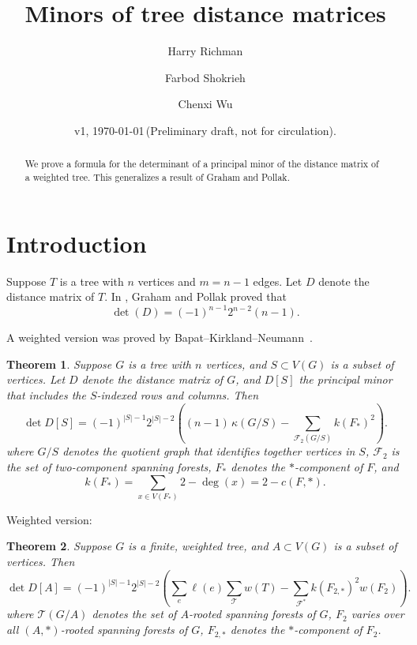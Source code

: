 \documentclass{amsart}
\newtheorem{thm}{Theorem}
\theoremstyle{definition}
\begin{document}
\title[Tree distance minors]{Minors of tree distance matrices}
\author{Harry Richman}
\author{Farbod Shokrieh}
\author{Chenxi Wu}
\date{v1, \today  \,(Preliminary draft, not for circulation).}


\begin{abstract}
We prove a formula for the determinant of 
a principal minor of
the distance matrix of a weighted tree.
This generalizes a result of Graham and Pollak.
\end{abstract}
\maketitle

\setcounter{tocdepth}{1}
\tableofcontents

\section{Introduction}

Suppose $T$ is a tree with $n$ vertices and $m=n-1$ edges.
Let $D$ denote the distance matrix of $T$.
In
\cite{graham-pollak},
Graham and Pollak proved that
\begin{equation}
\det(D) = (-1)^{n-1} 2^{n-2} (n-1). 
\end{equation}

A weighted version was proved by Bapat--Kirkland--Neumann~\cite{bapat-kirkland-neumann}.
\begin{thm}
\label{thm:main}
Suppose $G$ is a tree with $n$ vertices, and $S \subset V(G)$ is a subset of vertices.
Let $D$ denote the distance matrix of $G$,
and $D[S]$ the principal minor that includes the $S$-indexed rows and columns.
Then
\begin{equation}\label{eq:main}
\det D[S] = (-1)^{|S|-1} 2^{|S|-2} \left( (n-1)\, \kappa(G/S)  - \sum_{\mathcal F_2(G/S)} k(F_{*})^2  \right).
\end{equation}
where 
$G/S$ denotes the quotient graph that identifies together vertices in $S$,
$\mathcal F_2$ is the set of two-component spanning forests,
$F_{*}$ denotes the $*$-component of $F$, 
and
\begin{equation*}
k(F_{*}) 
= \sum_{x \in V( F_{*})} {2 - \deg(x)} = 2 - c(F,*).
\end{equation*}
\end{thm}

Weighted version:
\begin{thm}
\label{thm:w-max-capacity}
Suppose $G$ is a finite, weighted tree, and $A \subset V(G)$ is a subset of vertices.
Then
\begin{equation}\label{eq:w-max-capacity}
\det D[A] = (-1)^{|S|-1} 2^{|S|-2} \left( \sum_{e}\ell(e) \sum_{\mathcal T} w(T) - \sum_{\mathcal F^*} k(F_{2,*})^2 w(F_2) \right).
\end{equation}
where 
$\mathcal T(G/A)$ denotes the set of $A$-rooted spanning forests of $G$,
$F_2$ varies over all $(A,*)$-rooted spanning forests of $G$,
$F_{2,*}$ denotes the $*$-component of $F_2$.
\end{thm}
\end{document}
